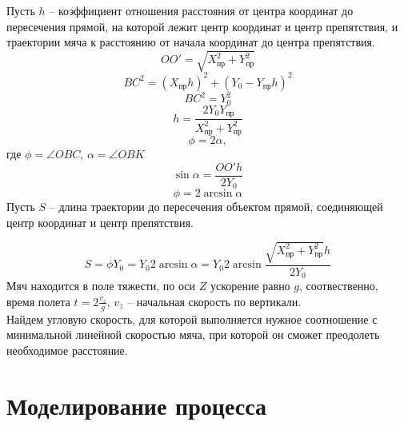 \documentclass[a5paper, 10pt]{article}
\theoremstyle{definition}
\theoremstyle{plain}
\theoremstyle{remark}
\begin{document}
Пусть $h$ -- коэффициент отношения расстояния от центра координат до пересечения прямой, на которой лежит центр координат и центр препятствия, и траектории мяча к расстоянию от начала координат до центра препятствия.
\begin{equation}
OO' = \sqrt{ X_{\text{пр}}^2 + Y_{\text{пр}}^2}
\end{equation}
\begin{equation}
BC^2 = \left( X_{\text{пр}} h \right)^2 + \left( Y_0 - Y_{\text{пр}} h \right)^2
\end{equation}
\begin{equation}
BC^2 =  Y_0^2
\end{equation}
\begin{equation}
h = \frac{2 Y_0  Y_{\text{пр}}}{X_{\text{пр}}^2 +  Y_{\text{пр}}^2 }
\end{equation}
\begin{equation}
\phi = 2 \alpha, 
\end{equation}
где $\phi = \angle OBC$, $\alpha = \angle OBK$
\begin{equation}
\sin \alpha = \frac{OO' h}{2 Y_0}
\end{equation}
\begin{equation}
\phi = 2 \arcsin \alpha
\end{equation}
Пусть $S$ -- длина траектории до пересечения объектом прямой, соединяющей центр координат и центр препятствия.

\begin{equation}
S = \phi Y_0 =  Y_0  2 \arcsin \alpha =  Y_0  2 \arcsin \frac{ \sqrt{ X_{\text{пр}}^2 + Y_{\text{пр}}^2} h}{2 Y_0}
\end{equation}
Мяч находится в поле тяжести, по оси $Z$ ускорение равно $g$, соотвественно, время полета $t = 2 \frac{v_z}{g}$, $v_z$ -- начальная скорость по вертикали.\\
Найдем угловую скорость, для которой выполняется нужное соотношение с минимальной линейной скоростью мяча, при которой он сможет преодолеть необходимое расстояние.\\



\section{Моделирование процесса}
\end{document}
